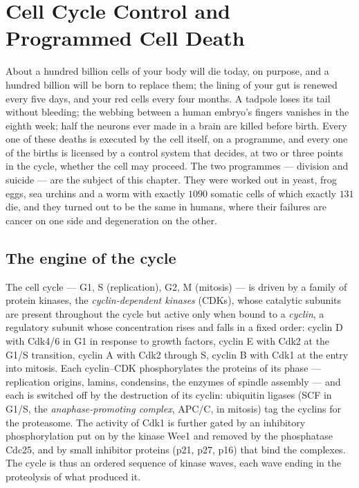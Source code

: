 \chapter{Cell Cycle Control and Programmed Cell Death}\label{ch:b3:cell-cycle-apoptosis}

About a hundred billion cells of your body will die today, on purpose,
and a hundred billion will be born to replace them; the lining of your
gut is renewed every five days, and your red cells every four months.
A tadpole loses its tail without bleeding; the webbing between a human
embryo's fingers vanishes in the eighth week; half the neurons ever
made in a brain are killed before birth. Every one of these deaths is
executed by the cell itself, on a programme, and every one of the
births is licensed by a control system that decides, at two or three
points in the cycle, whether the cell may proceed. The two programmes
--- division and suicide --- are the subject of this chapter. They were
worked out in yeast, frog eggs, sea urchins and a worm with exactly
$1090$ somatic cells of which exactly $131$ die, and they turned out to
be the same in humans, where their failures are cancer on one side and
degeneration on the other.

\section{The engine of the cycle}

\begin{definition}\label{def:b3:cell-cycle-apoptosis:cdk}
The cell cycle --- G1, S (replication), G2, M (mitosis) --- is driven by
a family of protein kinases, the \emph{cyclin-dependent kinases}
(CDKs), whose catalytic subunits are present throughout the cycle but
active only when bound to a \emph{cyclin}, a regulatory subunit whose
concentration rises and falls in a fixed order: cyclin D with Cdk4/6 in
G1 in response to growth factors, cyclin E with Cdk2 at the G1/S
transition, cyclin A with Cdk2 through S, cyclin B with Cdk1 at the
entry into mitosis. Each cyclin--CDK phosphorylates the proteins of its
phase --- replication origins, lamins, condensins, the enzymes of
spindle assembly --- and each is switched off by the destruction of
its cyclin: ubiquitin ligases (SCF in G1/S, the \emph{anaphase-promoting
complex}, APC/C, in mitosis) tag the cyclins for the proteasome. The
activity of Cdk1 is further gated by an inhibitory phosphorylation put
on by the kinase Wee1 and removed by the phosphatase Cdc25, and by
small inhibitor proteins (p21, p27, p16) that bind the complexes. The
cycle is thus an ordered sequence of kinase waves, each wave ending in
the proteolysis of what produced it.
\end{definition}

